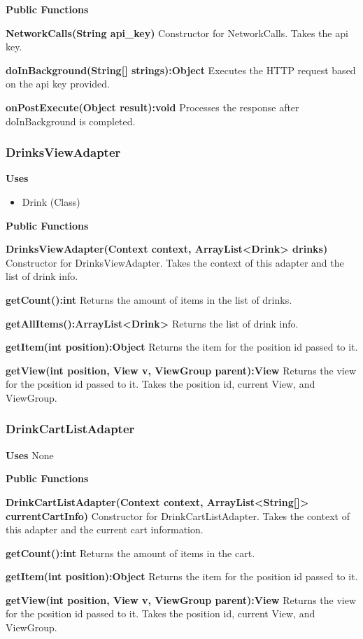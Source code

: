 \documentclass [10pt]{article}
\begin{document}
\textbf{Public Functions}

\textbf{NetworkCalls(String api\_key)}
Constructor for NetworkCalls. Takes the api key.

\textbf{doInBackground(String[] strings):Object}
Executes the HTTP request based on the api key provided.

\textbf{onPostExecute(Object result):void}
Processes the response after doInBackground is completed.

\subsubsection{DrinksViewAdapter}

\textbf{Uses}
\begin{itemize}
	\item Drink (Class)
\end{itemize}

\textbf{Public Functions}

\textbf{DrinksViewAdapter(Context context, ArrayList<Drink> drinks)}
Constructor for DrinksViewAdapter. Takes the context of this adapter and the list of drink info.

\textbf{getCount():int}
Returns the amount of items in the list of drinks.

\textbf{getAllItems():ArrayList<Drink>}
Returns the list of drink info.

\textbf{getItem(int position):Object}
Returns the item for the position id passed to it.

\textbf{getView(int position, View v, ViewGroup parent):View}
Returns the view for the position id passed to it. Takes the position id, current View, and ViewGroup.

\subsubsection{DrinkCartListAdapter}
\textbf{Uses} None

\textbf{Public Functions}

\textbf{DrinkCartListAdapter(Context context, ArrayList<String[]> currentCartInfo)}
Constructor for DrinkCartListAdapter. Takes the context of this adapter and the current cart information.

\textbf{getCount():int}
Returns the amount of items in the cart.

\textbf{getItem(int position):Object}
Returns the item for the position id passed to it.

\textbf{getView(int position, View v, ViewGroup parent):View}
Returns the view for the position id passed to it. Takes the position id, current View, and ViewGroup.
\end{document}
